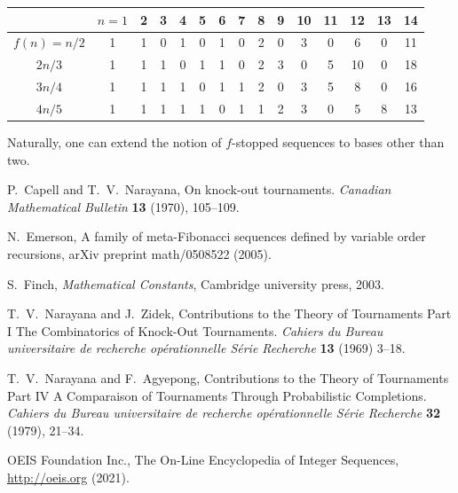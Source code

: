 \documentclass[12pt]{article}
\theoremstyle{definition}
\begin{document}
\begin{tabular}{| c | c | c | c | c | c | c | c | c | c | c | c | c | c | c |}
\hline
 & $n=1$ & 2 & 3 & 4 & 5 & 6 & 7 & 8 & 9 & 10 & 11 & 12 & 13 & 14 \\
\hline
$f(n) = n/2$ & 1 & 1 & 0 & 1 & 0 & 1 & 0 & 2 & 0 & 3 & 0 & 6 & 0 & 11\\
\hline
$2n/3$ & 1 & 1 & 1 & 0 & 1 & 1 & 0 & 2 & 3 & 0 & 5 & 10 & 0 & 18 \\
\hline
$3n/4$ & 1 & 1 & 1 & 1 & 0 & 1 & 1 & 2 & 0 & 3 & 5 & 8 & 0 & 16 \\
\hline
$4n/5$ & 1 & 1 & 1 & 1 & 1 & 0 & 1 & 1 & 2 & 3 & 0 & 5 & 8 & 13\\
\hline
\end{tabular}
 
Naturally, one can extend the notion of $f$-stopped sequences to bases other than two. 

\begin{thebibliography}{1}

P.~Capell and T.~V.~Narayana, On knock-out tournaments. \emph{Canadian
Mathematical Bulletin} \textbf{13} (1970), 105--109.

N.~Emerson, A family of meta-Fibonacci sequences defined by variable order
recursions, arXiv preprint math/0508522 (2005).

S.~Finch, \emph{Mathematical Constants}, Cambridge university press, 2003.

T.~V.~Narayana and J.~Zidek, Contributions to the Theory of Tournaments Part I
The Combinatorics of Knock-Out Tournaments. \emph{Cahiers du Bureau
universitaire de recherche op\'erationnelle S\'erie Recherche} \textbf{13}
(1969) 3--18.

T.~V.~Narayana and F.~Agyepong, Contributions to the Theory of Tournaments Part
IV A Comparaison of Tournaments Through Probabilistic Completions.
\emph{Cahiers du Bureau universitaire de recherche op\'erationnelle S\'erie
Recherche} \textbf{32} (1979), 21--34.

OEIS Foundation Inc., The On-Line Encyclopedia of Integer Sequences,
\url{http://oeis.org} (2021).

\end{thebibliography}
\end{document}
